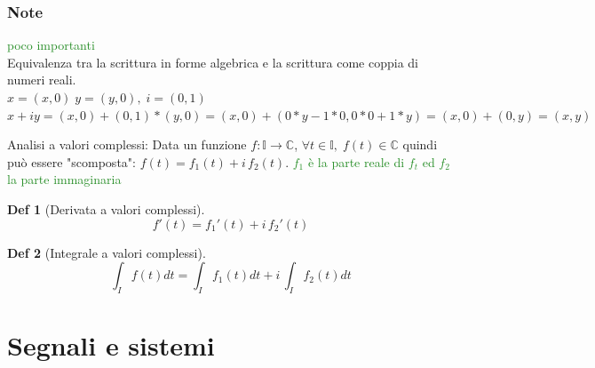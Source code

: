\documentclass[a4paper]{article}
\newtheorem*{definition}{Def}
\newcommand{\appunto}[1]{\textcolor{ForestGreen}{#1}}
\newcommand{\C}[0]{\mathbb{C}}
\begin{document}
\subsubsection{Note} 
\appunto{poco importanti}\\
Equivalenza tra la scrittura in forme algebrica e la scrittura come coppia di numeri reali.\\
$x = (x,0)\; y=(y,0),\; i=(0,1)$\\ 
$x+iy = (x,0) + (0,1)*(y,0) = (x,0) + (0*y - 1*0, 0*0 + 1*y ) = (x,0) + (0,y) = (x,y)$

Analisi a valori complessi:
Data un funzione $f: \mathbb{I} \rightarrow \C$,  $\forall t\in \mathbb{I},\; f(t)\in \C$
quindi può essere "scomposta": $f(t) = f_1(t) + i\,f_2(t)$.
\appunto{$f_1$ è la parte reale di $f_t$ ed $f_2$ la parte immaginaria}
\begin{definition}[Derivata a valori complessi]
	$$f'(t) = f_1'(t) + i\, f_2'(t)$$
\end{definition}
\begin{definition}[Integrale a valori complessi]
	$$\int_If(t) dt = \int_If_1(t) dt + i\, \int_If_2(t) dt$$
\end{definition}

\section{Segnali e sistemi}
\end{document}
